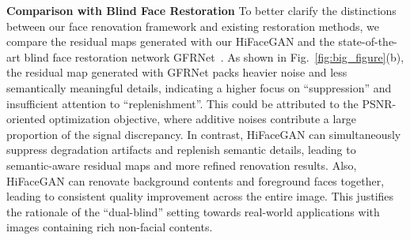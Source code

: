 \documentclass[sigconf]{acmart}
\begin{document}
\textbf{Comparison with Blind Face Restoration} To better clarify the distinctions between our face renovation framework and existing restoration methods, we compare the residual maps generated with our HiFaceGAN and the state-of-the-art blind face restoration network GFRNet~\cite{BlindFR-ECCV2018}. As shown in Fig.~\ref{fig:big_figure}(b), the residual map generated with GFRNet packs heavier noise and less semantically meaningful details, indicating a higher focus on ``suppression'' and insufficient attention to ``replenishment''. This could be attributed to the PSNR-oriented optimization objective, where additive noises contribute a large proportion of the signal discrepancy. In contrast, HiFaceGAN can simultaneously suppress degradation artifacts and replenish semantic details, leading to semantic-aware residual maps and more refined renovation results. Also, HiFaceGAN can renovate background contents and foreground faces together, leading to consistent quality improvement across the entire image. This justifies the rationale of the ``dual-blind'' setting towards real-world applications with images containing rich non-facial contents.
\end{document}
